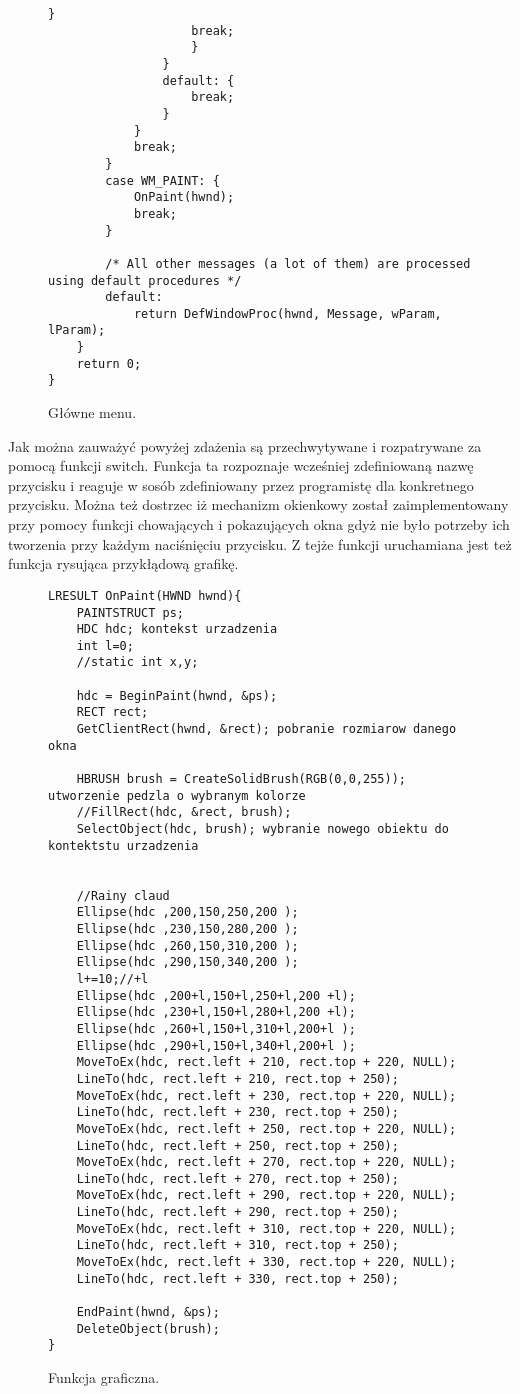 \documentclass[a4paper,twoside,12pt]{mgr}
\begin{document}
\begin{figure}[H]
\centering
\begin{lstlisting}[frame=single]	
												}
					break;
					}
				}
				default: {
					break;
				}
			}
			break;
		}
		case WM_PAINT: {
			OnPaint(hwnd);
			break;
		}
		
		/* All other messages (a lot of them) are processed using default procedures */
		default:
			return DefWindowProc(hwnd, Message, wParam, lParam);
	}
	return 0;
}
\end{lstlisting}
\caption{Główne menu.}%
\label{rys:etykieta}
\end{figure}

Jak można zauważyć powyżej zdażenia są przechwytywane i rozpatrywane za pomocą funkcji switch. Funkcja ta rozpoznaje wcześniej zdefiniowaną nazwę przycisku i reaguje w sosób zdefiniowany przez programistę dla konkretnego przycisku. Można też dostrzec iż mechanizm okienkowy został zaimplementowany przy pomocy funkcji chowających i pokazujących okna gdyż nie było potrzeby ich tworzenia przy każdym naciśnięciu przycisku. Z tejże funkcji uruchamiana jest też funkcja rysująca przykłądową grafikę.

\begin{figure}[H]
\centering
\begin{lstlisting}[frame=single]	
LRESULT OnPaint(HWND hwnd){
	PAINTSTRUCT ps;
	HDC hdc; kontekst urzadzenia
	int l=0;
	//static int x,y;

	hdc = BeginPaint(hwnd, &ps);
	RECT rect;
	GetClientRect(hwnd, &rect); pobranie rozmiarow danego okna
	
	HBRUSH brush = CreateSolidBrush(RGB(0,0,255)); utworzenie pedzla o wybranym kolorze
	//FillRect(hdc, &rect, brush);
	SelectObject(hdc, brush); wybranie nowego obiektu do kontektstu urzadzenia
	
	
	//Rainy claud
	Ellipse(hdc ,200,150,250,200 );
	Ellipse(hdc ,230,150,280,200 );
	Ellipse(hdc ,260,150,310,200 );
	Ellipse(hdc ,290,150,340,200 );
	l+=10;//+l
	Ellipse(hdc ,200+l,150+l,250+l,200 +l);
	Ellipse(hdc ,230+l,150+l,280+l,200 +l);
	Ellipse(hdc ,260+l,150+l,310+l,200+l );
	Ellipse(hdc ,290+l,150+l,340+l,200+l );
	MoveToEx(hdc, rect.left + 210, rect.top + 220, NULL);
	LineTo(hdc, rect.left + 210, rect.top + 250);
	MoveToEx(hdc, rect.left + 230, rect.top + 220, NULL);
	LineTo(hdc, rect.left + 230, rect.top + 250);
	MoveToEx(hdc, rect.left + 250, rect.top + 220, NULL);
	LineTo(hdc, rect.left + 250, rect.top + 250);
	MoveToEx(hdc, rect.left + 270, rect.top + 220, NULL);
	LineTo(hdc, rect.left + 270, rect.top + 250);
	MoveToEx(hdc, rect.left + 290, rect.top + 220, NULL);
	LineTo(hdc, rect.left + 290, rect.top + 250);
	MoveToEx(hdc, rect.left + 310, rect.top + 220, NULL);
	LineTo(hdc, rect.left + 310, rect.top + 250);
	MoveToEx(hdc, rect.left + 330, rect.top + 220, NULL);
	LineTo(hdc, rect.left + 330, rect.top + 250);
	
	EndPaint(hwnd, &ps);
	DeleteObject(brush);
}
\end{lstlisting}
\caption{Funkcja graficzna.}%
\label{rys:etykieta}
\end{figure}
\end{document}
